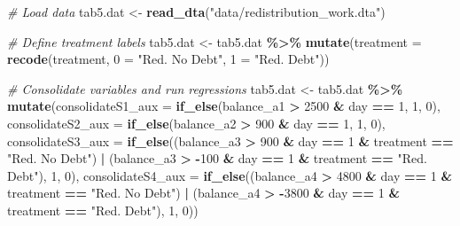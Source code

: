 \documentclass[
]{article}
\newenvironment{Shaded}{\begin{snugshade}}{\end{snugshade}}
\newcommand{\AttributeTok}[1]{\textcolor[rgb]{0.13,0.29,0.53}{#1}}
\newcommand{\CommentTok}[1]{\textcolor[rgb]{0.56,0.35,0.01}{\textit{#1}}}
\newcommand{\DecValTok}[1]{\textcolor[rgb]{0.00,0.00,0.81}{#1}}
\newcommand{\FunctionTok}[1]{\textcolor[rgb]{0.13,0.29,0.53}{\textbf{#1}}}
\newcommand{\NormalTok}[1]{#1}
\newcommand{\OtherTok}[1]{\textcolor[rgb]{0.56,0.35,0.01}{#1}}
\newcommand{\SpecialCharTok}[1]{\textcolor[rgb]{0.81,0.36,0.00}{\textbf{#1}}}
\newcommand{\StringTok}[1]{\textcolor[rgb]{0.31,0.60,0.02}{#1}}
\begin{document}
\begin{Shaded}
\begin{Highlighting}[]
\CommentTok{\# Load data}
\NormalTok{tab5.dat }\OtherTok{\textless{}{-}} \FunctionTok{read\_dta}\NormalTok{(}\StringTok{"data/redistribution\_work.dta"}\NormalTok{)}

\CommentTok{\# Define treatment labels}
\NormalTok{tab5.dat }\OtherTok{\textless{}{-}}\NormalTok{ tab5.dat }\SpecialCharTok{\%\textgreater{}\%}
  \FunctionTok{mutate}\NormalTok{(}\AttributeTok{treatment =} \FunctionTok{recode}\NormalTok{(treatment, }\StringTok{\textasciigrave{}}\AttributeTok{0}\StringTok{\textasciigrave{}} \OtherTok{=} \StringTok{"Red. No Debt"}\NormalTok{, }\StringTok{\textasciigrave{}}\AttributeTok{1}\StringTok{\textasciigrave{}} \OtherTok{=} \StringTok{"Red. Debt"}\NormalTok{))}

\CommentTok{\# Consolidate variables and run regressions}
\NormalTok{tab5.dat }\OtherTok{\textless{}{-}}\NormalTok{ tab5.dat }\SpecialCharTok{\%\textgreater{}\%}
  \FunctionTok{mutate}\NormalTok{(}\AttributeTok{consolidateS1\_aux =} \FunctionTok{if\_else}\NormalTok{(balance\_a1 }\SpecialCharTok{\textgreater{}} \DecValTok{2500} \SpecialCharTok{\&}\NormalTok{ day }\SpecialCharTok{==} \DecValTok{1}\NormalTok{, }\DecValTok{1}\NormalTok{, }\DecValTok{0}\NormalTok{),}
         \AttributeTok{consolidateS2\_aux =} \FunctionTok{if\_else}\NormalTok{(balance\_a2 }\SpecialCharTok{\textgreater{}} \DecValTok{900} \SpecialCharTok{\&}\NormalTok{ day }\SpecialCharTok{==} \DecValTok{1}\NormalTok{, }\DecValTok{1}\NormalTok{, }\DecValTok{0}\NormalTok{),}
         \AttributeTok{consolidateS3\_aux =} \FunctionTok{if\_else}\NormalTok{((balance\_a3 }\SpecialCharTok{\textgreater{}} \DecValTok{900} \SpecialCharTok{\&}\NormalTok{ day }\SpecialCharTok{==} \DecValTok{1} \SpecialCharTok{\&}\NormalTok{ treatment }\SpecialCharTok{==} \StringTok{"Red. No Debt"}\NormalTok{) }\SpecialCharTok{|}
\NormalTok{                                       (balance\_a3 }\SpecialCharTok{\textgreater{}} \SpecialCharTok{{-}}\DecValTok{100} \SpecialCharTok{\&}\NormalTok{ day }\SpecialCharTok{==} \DecValTok{1} \SpecialCharTok{\&}\NormalTok{ treatment }\SpecialCharTok{==} \StringTok{"Red. Debt"}\NormalTok{), }\DecValTok{1}\NormalTok{, }\DecValTok{0}\NormalTok{),}
         \AttributeTok{consolidateS4\_aux =} \FunctionTok{if\_else}\NormalTok{((balance\_a4 }\SpecialCharTok{\textgreater{}} \DecValTok{4800} \SpecialCharTok{\&}\NormalTok{ day }\SpecialCharTok{==} \DecValTok{1} \SpecialCharTok{\&}\NormalTok{ treatment }\SpecialCharTok{==} \StringTok{"Red. No Debt"}\NormalTok{) }\SpecialCharTok{|}
\NormalTok{                                       (balance\_a4 }\SpecialCharTok{\textgreater{}} \SpecialCharTok{{-}}\DecValTok{3800} \SpecialCharTok{\&}\NormalTok{ day }\SpecialCharTok{==} \DecValTok{1} \SpecialCharTok{\&}\NormalTok{ treatment }\SpecialCharTok{==} \StringTok{"Red. Debt"}\NormalTok{), }\DecValTok{1}\NormalTok{, }\DecValTok{0}\NormalTok{))}


\end{Highlighting}
\end{Shaded}
\end{document}
